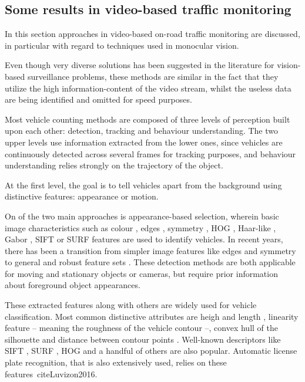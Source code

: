 \subsection{Some results in video-based traffic monitoring}
In this section approaches in video-based on-road traffic monitoring are discussed, in particular with regard to techniques used in monocular vision.

Even though very diverse solutions has been suggested in the literature for vision-based surveillance problems, these methods are similar in the fact that they utilize the high information-content of the video stream, whilst the useless data are being identified and omitted for speed purposes.

Most vehicle counting methods are composed of three levels of perception built upon each other: detection, tracking and behaviour understanding.
The two upper levels use information extracted from the lower ones, since vehicles are continuously detected across several frames for tracking purposes, and behaviour understanding relies strongly on the trajectory of the object.

At the first level, the goal is to tell vehicles apart from the background using distinctive features: appearance or motion.

On of the two main approaches is appearance-based selection, wherein basic image characteristics such as colour \cite{Chang2005}, edges \cite{Blanc2007}, symmetry \cite{Aytekin2010}, HOG \cite{Niknejad2012}, Haar-like \cite{Sivaraman2012}, Gabor \cite{Zhang2006}, SIFT \cite{Zhang2011} or SURF \cite{Lin2012} features are used to identify vehicles.
In recent years, there has been a transition from simpler image features like edges and symmetry to general and robust feature sets \cite{Sivaraman2012}.
These detection methods are both applicable for moving and stationary objects or cameras, but require prior information about foreground object appearances.

These extracted features along with others are widely used for vehicle classification.
Most common distinctive attributes are heigh and length \cite{Huang2004}, linearity feature -- meaning the roughness of the vehicle contour \cite{Zhang2008} --, convex hull of the silhouette \cite{Buch2010} and distance between contour points \cite{Lou2005}.
Well-known descriptors like SIFT \cite{Zhang2011}, SURF \cite{Lin2012}, HOG \cite{Niknejad2012} and a handful of others are also popular.
Automatic license plate recognition, that is also extensively used, relies on these features\ cite{Luvizon2016}. 

